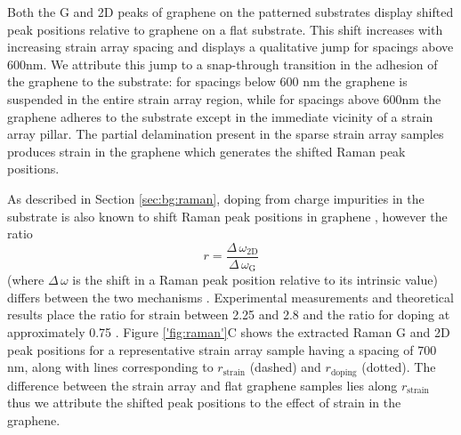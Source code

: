 \documentclass[edeposit,fullpage,draftthesis]{uiucthesis2009}
\begin{document}
           
            Both the G and 2D peaks of graphene on the patterned 
            substrates display shifted peak positions relative to graphene on a flat substrate. 
            This shift increases with increasing strain array spacing and displays a qualitative jump
            for spacings above 600nm. We attribute this jump to a 
            snap-through transition\cite{gill2015mechanical, scharfenberg2012observation}
            in the adhesion of the graphene to the substrate: for spacings below 600 nm the graphene is suspended
            in the entire strain array region, while for spacings above 600nm the graphene adheres to the substrate
            except in the immediate vicinity of a strain array pillar. The partial delamination
            present in the sparse strain array samples
            produces strain in the graphene which generates the shifted Raman peak positions.
            
            
            As described in Section \ref{sec:bg:raman}, doping from charge impurities in the substrate is also known to 
            shift Raman peak positions in graphene \cite{reina2008large, casiraghi2007raman}, however the ratio 
            \begin{equation}
                r = \frac{\Delta \, \omega_\text{2D}}{\Delta \, \omega_\text{G}}
            \end{equation}
            (where $\Delta \, \omega$ is the shift in a Raman peak position relative to its intrinsic value)
            differs between the two mechanisms \cite{lee2012optical}. 
            Experimental measurements \cite{zabel2012raman, metzger2009biaxial, ding2010stretchable} 
            and theoretical results \cite{mohr2010splitting, mohiuddin2009uniaxial} place the ratio for strain 
            between 2.25 and 2.8 and the ratio for doping at approximately 0.75 \cite{lee2012optical}. 
            Figure \ref{'fig:raman'}C shows the extracted Raman G and 2D peak positions for a representative
            strain array sample having a spacing of 700 nm,
            along with lines corresponding to $r_\text{strain}$ (dashed) and $r_\text{doping}$ (dotted). 
            The difference between the strain array and flat graphene samples lies along $r_\text{strain}$ thus we
            attribute the shifted peak positions to the effect of strain in the graphene.
            
\end{document}
